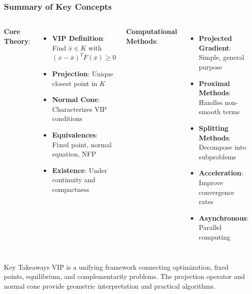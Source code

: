 \documentclass[aspectratio=169,10pt]{beamer}
\begin{document}
\begin{frame}
\frametitle{Summary of Key Concepts}

\vspace{0.2cm}

\begin{columns}[T]

\textbf{Core Theory}:
\begin{itemize}
    \item \textbf{VIP Definition}: Find $\bar{x} \in K$ with $(x - \bar{x})^T F(\bar{x}) \geq 0$

    \item \textbf{Projection}: Unique closest point in $K$

    \item \textbf{Normal Cone}: Characterizes VIP conditions

    \item \textbf{Equivalences}: Fixed point, normal equation, NFP

    \item \textbf{Existence}: Under continuity and compactness
\end{itemize}


\textbf{Computational Methods}:
\begin{itemize}
    \item \textbf{Projected Gradient}: Simple, general purpose

    \item \textbf{Proximal Methods}: Handles non-smooth terms

    \item \textbf{Splitting Methods}: Decompose into subproblems

    \item \textbf{Acceleration}: Improve convergence rates

    \item \textbf{Asynchronous}: Parallel computing
\end{itemize}

\end{columns}

\vspace{0.3cm}

\begin{block}{Key Takeaways}
VIP is a unifying framework connecting optimization, fixed points, equilibrium,
and complementarity problems. The projection operator and normal cone provide
geometric interpretation and practical algorithms.
\end{block}

\end{frame}
\end{document}
